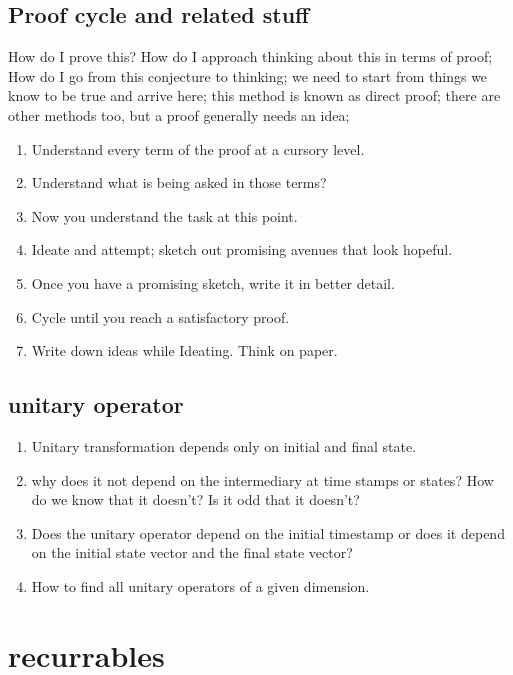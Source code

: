 \documentclass[14pt]{extarticle}
\begin{document}
\subsection*{Proof cycle and related stuff}

How do I prove this? How do I approach thinking about this in terms of proof; How do I go from this conjecture to thinking; we need to start from things we know to be true and arrive here; this method is known as direct proof; there are other methods too, but a proof generally needs an idea;

\begin{enumerate}
    \item Understand every term of the proof at a cursory level.
    \item Understand what is being asked in those terms?
    \item Now you understand the task at this point.
    \item Ideate and attempt; sketch out promising avenues that look hopeful.
    \item Once you have a promising sketch, write it in better detail.
    \item Cycle until you reach a satisfactory proof.
    \item Write down ideas while Ideating. Think on paper.
\end{enumerate}


\subsection{unitary operator}
\begin{enumerate}    
    \item Unitary transformation depends only on initial and final state.
    \item why does it not depend on the intermediary at time stamps or states? How do we know that it doesn't? Is it odd that it doesn't?
    \item Does the unitary operator depend on the initial timestamp or does it depend on the initial state vector and the final state vector?
    \item How to find all unitary operators of a given dimension.
\end{enumerate}


\section{recurrables}
\end{document}
